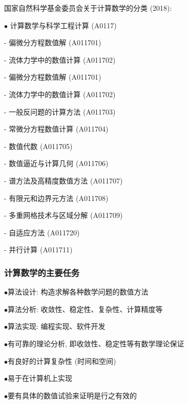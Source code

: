 \documentclass[notheorems,serif]{beamer}
\begin{document}
\begin{frame}
国家自然科学基金委员会关于计算数学的分类 (2018):

$\bullet$ 计算数学与科学工程计算 (A0117)

\qquad- 偏微分方程数值解 (A011701)

\qquad- 流体力学中的数值计算 (A011702)

\qquad- 偏微分方程数值解 (A011701)

\qquad- 流体力学中的数值计算 (A011702)

\qquad- 一般反问题的计算方法 (A011703)

\qquad- 常微分方程数值计算 (A011704)

\qquad- 数值代数 (A011705)

\qquad- 数值逼近与计算几何 (A011706)

\qquad- 谱方法及高精度数值方法 (A011707)

\qquad- 有限元和边界元方法 (A011708)

\qquad- 多重网格技术与区域分解 (A011709)

\qquad- 自适应方法 (A011720)

\qquad- 并行计算 (A011711)
\end{frame}

\begin{frame}
\frametitle{计算数学的主要任务}
$\bullet$算法设计: 构造求解各种数学问题的数值方法

$\bullet$算法分析: 收敛性、稳定性、复杂性、计算精度等

$\bullet$算法实现: 编程实现、软件开发

{}

$\bullet$有可靠的理论分析, 即收敛性、稳定性等有数学理论保证

$\bullet$有良好的计算复杂性 (时间和空间)

$\bullet$易于在计算机上实现

$\bullet$要有具体的数值试验来证明是行之有效的
\end{frame}
\end{document}
